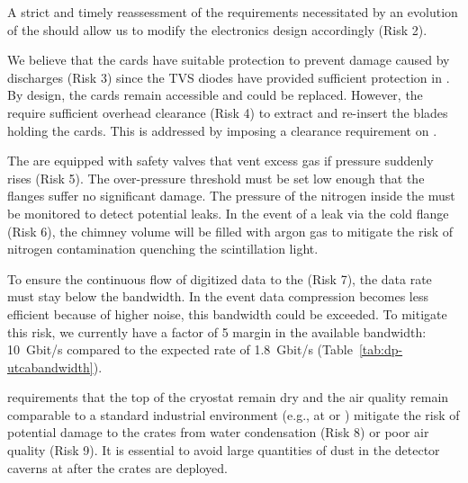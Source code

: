 A strict and timely %
reassessment of the  requirements %
necessitated by an evolution of the \dual {} should allow us to %
modify the   electronics design accordingly (Risk 2). %

We believe that the  cards %
have suitable protection to prevent damage caused by  discharges (Risk 3) since the  TVS diodes %
have provided sufficient protection %
in . By design, the  cards remain accessible and could be replaced.
However, the  require sufficient overhead clearance (Risk 4) to extract and re-insert %
the blades holding the  cards. %
This %
is addressed by imposing a clearance %
requirement on %
.

The  are equipped with safety valves that vent excess gas if pressure suddenly rises (Risk 5). The over-pressure threshold must be set low enough that the flanges suffer no significant damage. The pressure of the nitrogen inside the  must %
be monitored to detect potential leaks. In the event of a leak %
via the cold flange (Risk 6), the chimney volume will %
be filled with argon gas to mitigate the risk of %
nitrogen contamination %
quenching the scintillation light.  

To ensure the continuous flow of digitized data to the  (Risk 7), the data rate must stay below the  bandwidth.  %
In the event data compression becomes less efficient because of higher noise, this bandwidth could be exceeded. To mitigate this risk, we currently have a %
factor of \num{5} margin in the available bandwidth: \SI{10}{Gbit/s}  compared to the expected rate of \SI{1.8}{Gbit/s} (Table~\ref{tab:dp-utcabandwidth}).

 requirements that the top of the cryostat remain dry and the air quality remain comparable to a standard industrial environment (e.g., at  or ) mitigate the risk of potential damage to the  crates from water condensation (Risk 8) or poor air quality (Risk 9). It is essential to avoid large quantities of dust in the detector caverns at  after the  crates are deployed.
